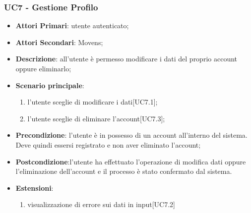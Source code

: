 \subsubsection{UC7 - Gestione Profilo}
\begin{itemize}
	\item \textbf{Attori Primari}: utente autenticato;
	\item \textbf{Attori Secondari}: Movens\glo;
	\item \textbf{Descrizione}: all'utente è permesso modificare i dati del proprio account oppure eliminarlo;
	\item \textbf{Scenario principale}: 
	\begin{enumerate}[label=\alph*.]
		\item l'utente sceglie di modificare i dati[UC7.1];
		\item l'utente sceglie di eliminare l'account[UC7.3];
	\end{enumerate}
	
	\item \textbf{Precondizione}: l'utente è in possesso di un account all'interno del sistema. Deve quindi essersi registrato e non aver eliminato l'account;
	\item \textbf{Postcondizione}:l'utente ha effettuato l'operazione di modifica dati oppure l'eliminazione dell'account e il processo è stato confermato dal sistema.
	\item \textbf{Estensioni}:
	\begin{enumerate}
	\item visualizzazione di errore sui dati in input[UC7.2]
	\end{enumerate}
\end{itemize} 
